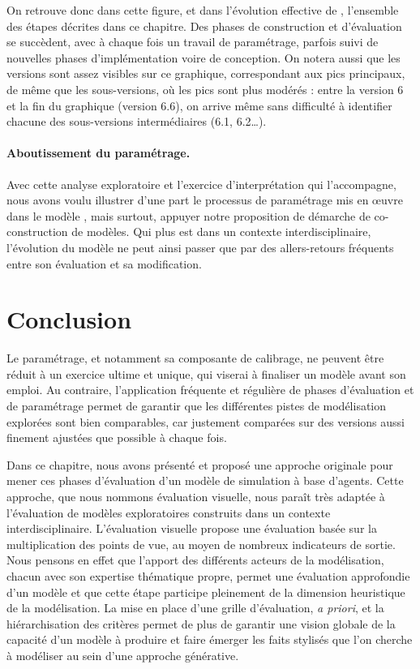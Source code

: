 On retrouve donc dans cette figure, et dans l'évolution effective de \simfeodal{}, l'ensemble des étapes décrites dans ce chapitre.
Des phases de construction et d'évaluation se succèdent, avec à chaque fois un travail de paramétrage, parfois suivi de nouvelles phases d'implémentation voire de conception.
On notera aussi que les versions sont assez visibles sur ce graphique, correspondant aux pics principaux, de même que les sous-versions, où les pics sont plus modérés : entre la version 6 et la fin du graphique (version 6.6), on arrive même sans difficulté à identifier chacune des sous-versions intermédiaires (6.1, 6.2\ldots).

\paragraph{Aboutissement du paramétrage.}

Avec cette analyse exploratoire et l'exercice d'interprétation qui l'accompagne, nous avons voulu illustrer d'une part le processus de paramétrage mis en œuvre dans le modèle \simfeodal{}, mais surtout, appuyer notre proposition de démarche de co-construction de modèles.
Qui plus est dans un contexte interdisciplinaire, l'évolution du modèle ne peut ainsi passer que par des allers-retours fréquents entre son évaluation et sa modification.

\section*{Conclusion}
\label{sec:chap3-conclu}

Le paramétrage, et notamment sa composante de calibrage, ne peuvent être réduit à un exercice ultime et unique, qui viserai à \og finaliser\fg{} un modèle avant son emploi.
Au contraire, l'application fréquente et régulière de phases d'évaluation et de paramétrage permet de garantir que les différentes pistes de modélisation explorées sont bien comparables, car justement comparées sur des versions aussi finement ajustées que possible à chaque fois.

Dans ce chapitre, nous avons présenté et proposé une approche originale pour mener ces phases d'évaluation d'un modèle de simulation à base d'agents.
Cette approche, que nous nommons évaluation visuelle, nous paraît très adaptée à l'évaluation de modèles exploratoires construits dans un contexte interdisciplinaire.
L'évaluation visuelle propose une évaluation basée sur la multiplication des points de vue, au moyen de nombreux indicateurs de sortie.
Nous pensons en effet que l'apport des différents acteurs de la modélisation, chacun avec son expertise thématique propre, permet une évaluation approfondie d'un modèle et que cette étape participe pleinement de la dimension heuristique de la modélisation.
La mise en place d'une grille d'évaluation, \textit{a priori}, et la hiérarchisation des critères permet de plus de garantir une vision globale de la capacité d'un modèle à produire et faire émerger les faits stylisés que l'on cherche à modéliser au sein d'une approche générative.

